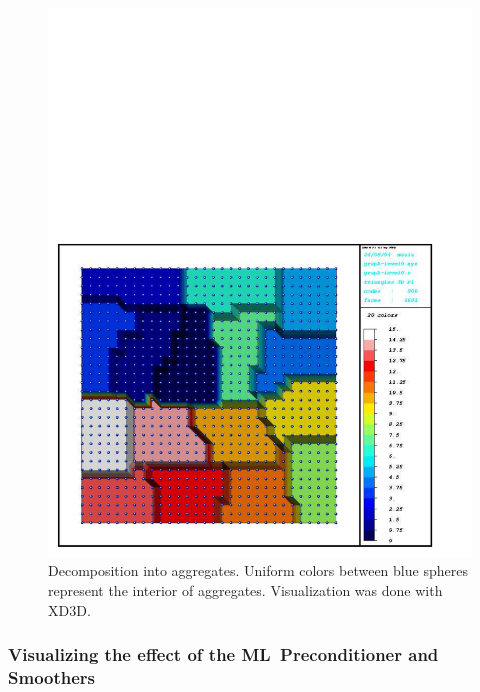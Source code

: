\documentclass{article}[11pt]
\newcommand{\ML}     {{\bf ML}}
\begin{document}
\begin{figure}[ht]
\centering
\includegraphics[width=12cm]{aggregate_decomposition}
\caption{Decomposition into aggregates. Uniform colors between blue spheres
represent the interior of aggregates.  Visualization was done with XD3D.}
\label{fig:viz:aggr}
\end{figure}


\subsubsection{Visualizing the effect of the \ML~Preconditioner and Smoothers}
\end{document}
